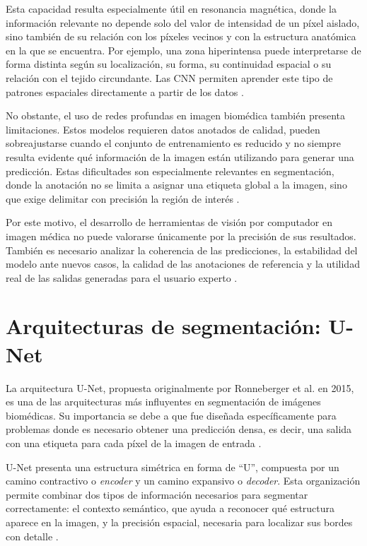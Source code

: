Esta capacidad resulta especialmente útil en resonancia magnética, donde la información relevante no depende solo del valor de intensidad de un píxel aislado, sino también de su relación con los píxeles vecinos y con la estructura anatómica en la que se encuentra. Por ejemplo, una zona hiperintensa puede interpretarse de forma distinta según su localización, su forma, su continuidad espacial o su relación con el tejido circundante. Las CNN permiten aprender este tipo de patrones espaciales directamente a partir de los datos \citep{litjens2017survey,yamashita2018cnnRadiology}.

No obstante, el uso de redes profundas en imagen biomédica también presenta limitaciones. Estos modelos requieren datos anotados de calidad, pueden sobreajustarse cuando el conjunto de entrenamiento es reducido y no siempre resulta evidente qué información de la imagen están utilizando para generar una predicción. Estas dificultades son especialmente relevantes en segmentación, donde la anotación no se limita a asignar una etiqueta global a la imagen, sino que exige delimitar con precisión la región de interés \citep{hesamian2019deep,tajbakhsh2016cnn}.

Por este motivo, el desarrollo de herramientas de visión por computador en imagen médica no puede valorarse únicamente por la precisión de sus resultados. También es necesario analizar la coherencia de las predicciones, la estabilidad del modelo ante nuevos casos, la calidad de las anotaciones de referencia y la utilidad real de las salidas generadas para el usuario experto \citep{litjens2017survey,zhang2023multipleannotators}.

\section{Arquitecturas de segmentación: U-Net}

La arquitectura U-Net, propuesta originalmente por Ronneberger et al. en 2015, es una de las arquitecturas más influyentes en segmentación de imágenes biomédicas. Su importancia se debe a que fue diseñada específicamente para problemas donde es necesario obtener una predicción densa, es decir, una salida con una etiqueta para cada píxel de la imagen de entrada \citep{ronneberger2015unet}.

U-Net presenta una estructura simétrica en forma de ``U'', compuesta por un camino contractivo o \textit{encoder} y un camino expansivo o \textit{decoder}. Esta organización permite combinar dos tipos de información necesarios para segmentar correctamente: el contexto semántico, que ayuda a reconocer qué estructura aparece en la imagen, y la precisión espacial, necesaria para localizar sus bordes con detalle \citep{ronneberger2015unet,shen2017deep}.

